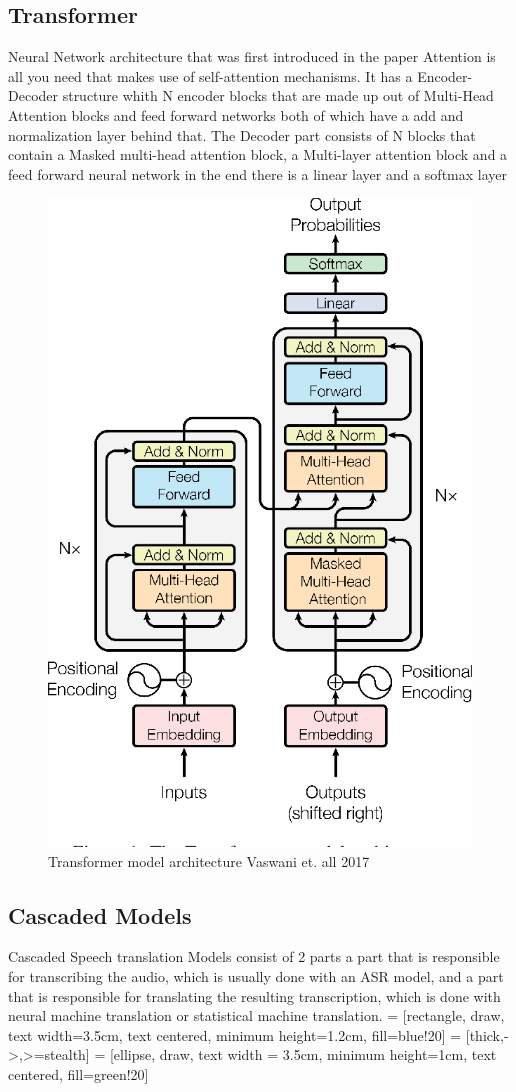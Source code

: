 \subsection{Transformer}
Neural Network architecture that was first introduced in the paper Attention is all you need \cite{vaswani2023attentionneed} that makes use of self-attention mechanisms. 
It has a Encoder-Decoder structure whith N encoder blocks that are made up out of Multi-Head Attention blocks and feed forward networks both of which have a add and normalization layer behind that. 
The Decoder part consists of N blocks that contain a Masked multi-head attention block, a Multi-layer attention block and a feed forward neural network 
in the end there is a linear layer and a softmax layer

\begin{figure}
        \centering
        \includegraphics[width=0.5\linewidth]{Latex//sections//images/transformermodel.png}
        \caption{Transformer model architecture Vaswani et. all 2017}
        \label{fig:enter-label}
    \end{figure}

\subsection{Cascaded Models}
Cascaded Speech translation Models consist of 2 parts a part that is responsible for transcribing the audio, which is usually done with an ASR model, and a part that is responsible for translating the resulting transcription, which is done with neural machine translation or statistical machine translation. 
 = [rectangle, draw, text width=3.5cm, text centered, minimum height=1.2cm, fill=blue!20]
 = [thick,->,>=stealth]
 = [ellipse, draw, text width = 3.5cm, minimum height=1cm, text centered, fill=green!20]

